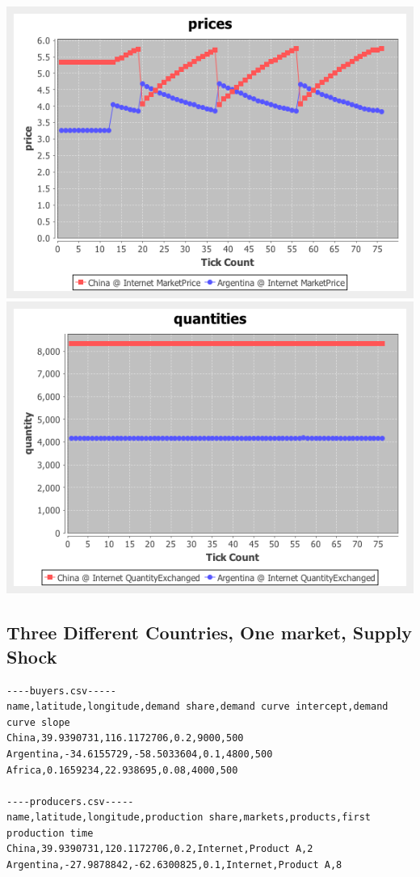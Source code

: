 \documentclass{article}
\begin{document}
\vskip2mm
\hskip-2cm
\includegraphics[scale=0.4]{fig_case5_prices}
\includegraphics[scale=0.4]{fig_case5_quantities}


\subsection{Three Different Countries, One market, Supply Shock}



\begin{verbatim}
----buyers.csv-----
name,latitude,longitude,demand share,demand curve intercept,demand curve slope
China,39.9390731,116.1172706,0.2,9000,500
Argentina,-34.6155729,-58.5033604,0.1,4800,500
Africa,0.1659234,22.938695,0.08,4000,500

----producers.csv-----
name,latitude,longitude,production share,markets,products,first production time
China,39.9390731,120.1172706,0.2,Internet,Product A,2
Argentina,-27.9878842,-62.6300825,0.1,Internet,Product A,8
\end{verbatim}
\end{document}
